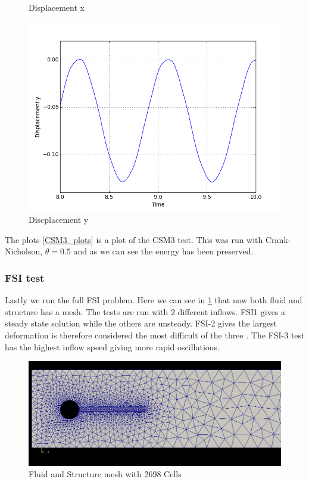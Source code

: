 \begin{figure}[H]
\begin{minipage}[b]{0.5\linewidth}
    \caption{Displacement x} 
    \vspace{4ex}
  \end{minipage}%
  \begin{minipage}[b]{0.5\linewidth}
    \centering
    \includegraphics[width=.75\linewidth]{./Verification_Validation/Hron_Turek/dis_y_short.png} 
    \caption{Discplacement y} 
    \vspace{4ex}
  \end{minipage} 
\end{figure}

The plots \ref{CSM3_plots} is a plot of the CSM3 test. This was run with Crank-Nicholson, $\theta = 0.5$ and as we can see the energy has been preserved. 

\subsubsection*{FSI test}
Lastly we run the full FSI problem. Here we can see in \ref{fig:fluid_structure} that now both fluid and structure has a mesh. The tests are run with 2 different inflows. FSI1 gives a steady state solution while the others are unsteady. FSI-2 gives the largest deformation is therefore considered the most difficult of the three \cite{Richter2013}. The FSI-3 test has the highest inflow speed giving more rapid oscillations.

\begin{figure}[H]
\label{fig:fluid_structure}
\caption{Fluid and Structure mesh with 2698 Cells}
\includegraphics[scale=0.45, trim={4mm 21mm 2mm 10mm},clip]{./Verification_Validation/Hron_Turek/fluid_structure.png}
\end{figure}

